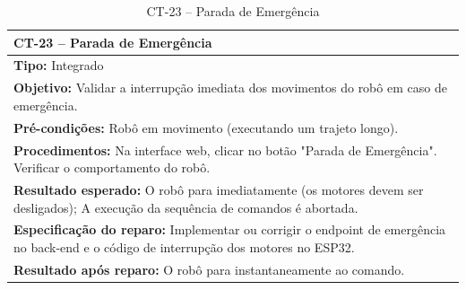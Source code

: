 
\begin{table}[H]
\centering
\begin{tabular}{|p{}|}
\hline
\textbf{CT-23 – Parada de Emergência} \\ \hline
\textbf{Tipo:} Integrado \\ \hline
\textbf{Objetivo:} Validar a interrupção imediata dos movimentos do robô em caso de emergência. \\ \hline
\textbf{Pré-condições:} Robô em movimento (executando um trajeto longo). \\ \hline
\textbf{Procedimentos:} Na interface web, clicar no botão "Parada de Emergência". Verificar o comportamento do robô. \\ \hline
\textbf{Resultado esperado:} O robô para imediatamente (os motores devem ser desligados); A execução da sequência de comandos é abortada. \\ \hline
\textbf{Especificação do reparo:} Implementar ou corrigir o endpoint de emergência no back-end e o código de interrupção dos motores no ESP32. \\ \hline
\textbf{Resultado após reparo:} O robô para instantaneamente ao comando. \\ \hline
\end{tabular}
\caption{CT-23 – Parada de Emergência}
\end{table}




